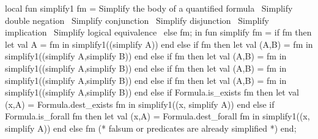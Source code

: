 \nwenddocs{}\endmoddef\nwstartdeflinemarkup{}\nwenddeflinemarkup
local
  fun simplify1 fm =
    \LA{}Simplify the body of a quantified formula~{\nwtagstyle{}}\RA{}
    \LA{}Simplify double negation~{\nwtagstyle{}}\RA{}
    \LA{}Simplify conjunction~{\nwtagstyle{}}\RA{}
    \LA{}Simplify disjunction~{\nwtagstyle{}}\RA{}
    \LA{}Simplify implication~{\nwtagstyle{}}\RA{}
    \LA{}Simplify logical equivalence~{\nwtagstyle{}}\RA{}
    else fm;
in
fun simplify fm =
  if  fm
  then let val A =  fm
       in simplify1((simplify A)) end
  else if  fm
  then let val (A,B) =  fm
       in simplify1((simplify A,simplify B)) end
  else if  fm
  then let val (A,B) =  fm
       in simplify1((simplify A,simplify B)) end
  else if  fm
  then let val (A,B) =  fm
       in simplify1((simplify A,simplify B)) end
  else if  fm
  then let val (A,B) =  fm
       in simplify1((simplify A,simplify B)) end
  else if Formula.is_exists fm
  then let val (x,A) = Formula.dest_exists fm
       in simplify1((x, simplify A)) end
  else if Formula.is_forall fm
  then let val (x,A) = Formula.dest_forall fm
       in simplify1((x, simplify A)) end
  else fm (* falsum or predicates are already simplified *)
end;
